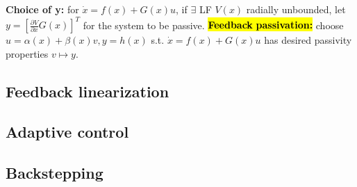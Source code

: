 \textbf{Choice of y:} for $\dot{x}=f(x)+G(x) u$, if $\exists$ LF $V(x)$ radially unbounded, let $y=\left[\frac{\partial V}{\partial x} G(x)\right]^{T}$ for the system to be passive.
\hl{\textbf{Feedback} \textbf{passivation:}} choose $u=\alpha(x)+\beta(x) v, y=h(x)$ s.t. $\dot{x}=f(x)+G(x) u$ has desired passivity properties $v \mapsto y$.

\subsection{Feedback linearization}


\subsection{Adaptive control}


\subsection{Backstepping}

